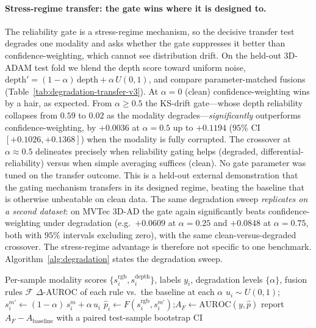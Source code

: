\documentclass[10pt,conference]{IEEEtran}
\begin{document}
\paragraph{Stress-regime transfer: the gate wins where it is designed
to.} The reliability gate is a stress-regime mechanism, so the decisive
transfer test degrades one modality and asks whether the gate suppresses
it better than confidence-weighting, which cannot see distribution
drift. On the held-out 3D-ADAM test fold we blend the depth score toward
uniform noise, $\text{depth}' = (1-\alpha)\,\text{depth} + \alpha\,U(0,1)$,
and compare parameter-matched fusions
(Table~\ref{tab:degradation-transfer-v3}). At $\alpha=0$ (clean)
confidence-weighting wins by a hair, as expected. From $\alpha\ge 0.5$
the KS-drift gate---whose depth reliability collapses from $0.59$ to
$0.02$ as the modality degrades---\emph{significantly} outperforms
confidence-weighting, by $+0.0036$ at $\alpha=0.5$ up to $+0.1194$
($95\%$ CI $[+0.1026,+0.1368]$) when the modality is fully corrupted.
The crossover at $\alpha\approx 0.5$ delineates precisely when
reliability gating helps (degraded, differential-reliability) versus
when simple averaging suffices (clean). No gate parameter was tuned on
the transfer outcome. This is a held-out external demonstration that the
gating mechanism transfers in its designed regime, beating the baseline
that is otherwise unbeatable on clean data. The same degradation sweep
\emph{replicates on a second dataset}: on MVTec 3D-AD the gate again
significantly beats confidence-weighting under degradation (e.g.\
$+0.0609$ at $\alpha=0.25$ and $+0.0848$ at $\alpha=0.75$, both with
$95\%$ intervals excluding zero), with the same clean-versus-degraded
crossover. The stress-regime advantage is therefore not specific to one
benchmark. Algorithm~\ref{alg:degradation} states the degradation sweep.

\begin{algorithm}[t]
\caption{Stress-regime degradation sweep (per modality $m$)}
\label{alg:degradation}
\begin{algorithmic}[1]
\Require Per-sample modality scores $\{s^{\text{rgb}}_i, s^{\text{depth}}_i\}$, labels $y_i$, degradation levels $\{\alpha\}$, fusion rules $\mathcal{F}$
\Ensure $\Delta$-AUROC of each rule vs.\ the baseline at each $\alpha$
\For{each $\alpha \in \{0,0.25,0.5,0.75,1\}$}
    \State $u_i \sim U(0,1)$;\quad $s^{m\prime}_i \gets (1-\alpha)\,s^m_i + \alpha\,u_i$ 
    \For{each rule $F \in \mathcal{F}$}
        \State $\hat p_i \gets F(s^{\text{rgb}}_i, s^{m\prime}_i)$;\quad $A_F \gets \mathrm{AUROC}(y, \hat p)$
    \EndFor
    \State report $A_F - A_{\text{baseline}}$ with a paired test-sample bootstrap CI
\EndFor
\end{algorithmic}
\end{algorithm}
\end{document}
